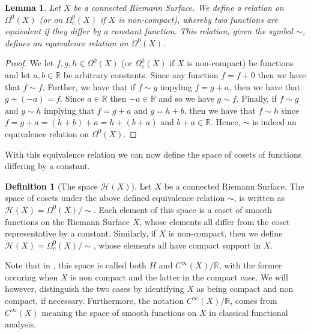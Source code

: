 \documentclass[11pt]{report}
\newtheorem{lemma}[thm]{Lemma}
\theoremstyle{definition}
\newtheorem{defn}[thm]{Definition}
\begin{document}


\begin{lemma}
  Let $X$ be a connected Riemann Surface. We define a relation on $\Omega^0(X)$ (or on $\Omega^0_c(X)$ if $X$ is non-compact), whereby two functions are equivalent if they differ by a constant function. This relation, given the symbol $\sim$, defines an equivalence relation on $\Omega^0(X)$.
\end{lemma}

\begin{proof}
  We let $f,g,h \in \Omega^0(X)$ (or $\Omega^0_c(X)$ if $X$ is non-compact) be functions and let $a, b \in \mathbb{R}$ be arbitrary constants. 
  Since any function $f = f + 0$ then we have that $f \sim f$. 
  Further, we have that if $f \sim g$ impyling $f = g + a$, then we have that $g + (-a) = f$. Since $a \in \mathbb{R}$ then $-a \in \mathbb{R}$ and so we have $g \sim f$. 
  Finally, if $f \sim g$ and $g \sim h$ implying that $f = g + a$ and $g = h + b$, then we have that $f \sim h$ since $f = g + a = (h + b) + a = h + (b + a)$ and $b+a \in \mathbb{R}$. Hence, $\sim$ is indeed an equivalence relation on $\Omega^0(X)$. 
\end{proof}

With this equivalence relation we can now define the space of cosets of functions differing by a constant.

\begin{defn}[The space $\mathcal{H}(X)$]
  Let $X$ be a connected Riemann Surface. The space of cosets under the above defined equivalence relation $\sim$, is written as $\mathcal{H}(X) = \Omega^0(X)/\sim$. Each element of this space is a coset of smooth functions on the Riemann Surface $X$, whose elements all differ from the coset representative by a constant. 
  Similarly, if $X$ is non-compact, then we define $\mathcal{H}(X) = \Omega^0_c(X)/\sim$, whose elements all have compact support in $X$.
\end{defn}

Note that in \cite{donaldson}, this space is called both $H$ and $C^{\infty}(X)/\mathbb{R}$, with the former occuring when $X$ is non compact and the latter in the compact case. We will however, distinguish the two cases by identifying $X$ as being compact and non compact, if necessary. Furthermore, the notation $C^{\infty}(X)/\mathbb{R}$, comes from $C^{\infty}(X)$ meaning the space of smooth functions on $X$ in classical functional analysis. 
\end{document}
